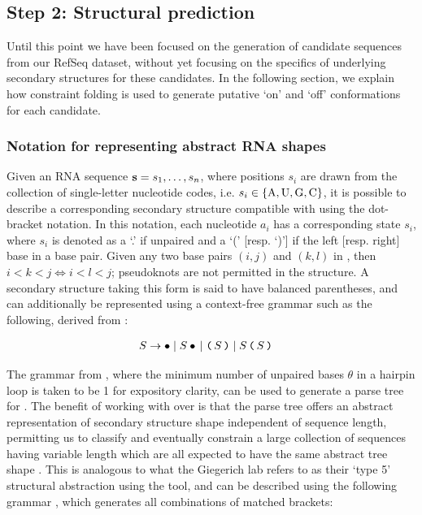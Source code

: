 \subsection{Step 2: Structural prediction}
\label{subsec:rfinder:strpred}

Until this point we have been focused on the generation of candidate sequences
from our RefSeq dataset, without yet focusing on the specifics of underlying
secondary structures for these candidates. In the following section, we explain
how constraint folding is used to generate putative `on' and `off' conformations
for each candidate.

\subsubsection{Notation for representing abstract RNA shapes}
\label{subsubsec:rfinder:shapes}

Given an RNA sequence ${\bf s} = s_1,\dots,s_n$, where positions $s_i$ are drawn from the
collection of single-letter nucleotide codes, i.e.
$s_i \in \{\text{A,\,U,\,G,\,C}\}$, it is possible to describe a corresponding
secondary structure \strS compatible with \seq using the dot-bracket notation.
In this notation, each nucleotide $a_i$ has a corresponding state $s_i$, where
$s_i$ is denoted as a `.' if unpaired and a `(' [resp. `)'] if the left [resp.
right] base in a base pair. Given any two base pairs $(i,j)$ and $(k,l)$ in \strS,
then $i < k < j \iff i < l < j$; pseudoknots are not permitted in the structure. A
secondary structure taking this form is said to have balanced parentheses, and can
additionally be represented using a context-free grammar such as the
following, derived from \citep{fusy:2012ka}:

\begin{align}
\label{eq:rfinder:strCfg}
S &\rightarrow \bullet \;|\; S \bullet \,|\; \bpL S \bpR \;|\; S\, \bpL S \bpR
\end{align}

The grammar from ,
where the minimum number of unpaired bases $\theta$ in a hairpin loop
is taken to be 1 for expository clarity,
can be used to generate a parse tree
\tree for \strS. The benefit of working with \tree over \strS is that the parse
tree offers an abstract representation of secondary structure shape independent of
sequence length, permitting us to classify and eventually constrain a large
collection of sequences having variable length which are all expected to have the
same abstract tree shape \citep{voss:2006iq}. This is analogous to what
the Giegerich lab refers to as
their `type 5' structural abstraction using the \rshapes tool, and can be
described using the following grammar \citep{Lorenz:2008gz}, which generates
all combinations of matched brackets:


